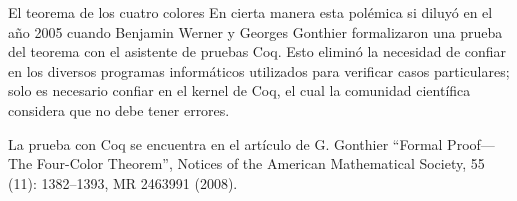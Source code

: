 \begin{section}{El teorema de los cuatro colores}
En  cierta manera esta polémica si diluyó en el año 2005 cuando Benjamin Werner y Georges Gonthier formalizaron una prueba del teorema con el asistente de pruebas Coq. Esto eliminó la necesidad de confiar en los diversos programas informáticos utilizados para verificar casos particulares; solo es necesario confiar en el kernel de Coq, el cual la comunidad científica considera que no debe tener errores. 

La prueba con Coq se encuentra en el artículo de G. Gonthier ``Formal Proof—The Four-Color Theorem'', Notices of the American Mathematical Society, 55 (11): 1382–1393, MR 2463991 (2008).  

\end{section}

